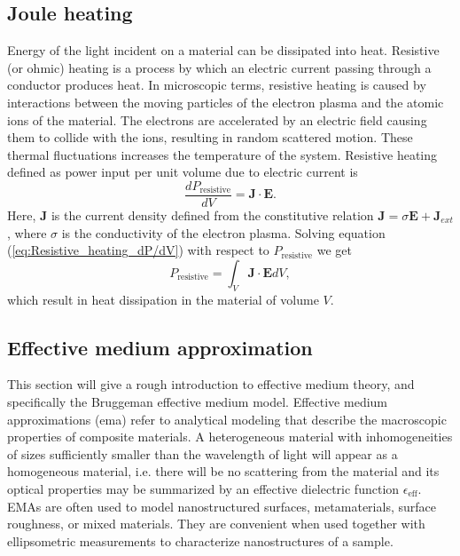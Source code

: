\subsection{Joule heating}
Energy of the light incident on a material can be dissipated into heat. Resistive (or ohmic) heating is a process by which an electric current passing through a conductor produces heat. In microscopic terms, resistive heating is caused by interactions between the moving particles of the electron plasma and the atomic ions of the material. The electrons are accelerated by an electric field causing them to collide with the ions, resulting in random scattered motion. These thermal fluctuations increases the temperature of the system. Resistive heating defined as power input per unit volume due to electric current is \cite{jackson}
\begin{equation}
    \frac{dP_{\text{resistive}}}{dV} = \mathbf{J}\cdot\mathbf{E}.
    \label{eq:Resistive_heating_dP/dV}
\end{equation}
Here, $\mathbf{J}$ is the current density defined from the constitutive relation $\mathbf{J}=\sigma\mathbf{E}+\mathbf{J}_{ext}$, where $\sigma$ is the conductivity of the electron plasma.  Solving equation (\ref{eq:Resistive_heating_dP/dV}) with respect to $P_{\text{resistive}}$ we get
\begin{equation}
    P_{\text{resistive}} = \int_V \mathbf{J}\cdot\mathbf{E} dV,
    \label{eq:Resistive_heating_P}
\end{equation}
which result in heat dissipation in the material of volume $V$.

\subsection{Effective medium approximation}
This section will give a rough introduction to effective medium theory, and specifically the Bruggeman effective medium model. Effective medium approximations (\ac{ema}) refer to analytical modeling that describe the macroscopic properties of composite materials. A heterogeneous material with inhomogeneities of sizes sufficiently smaller than the wavelength of light will appear as a homogeneous material, i.e. there will be no scattering from the material and its optical properties may be summarized by an effective dielectric function $\epsilon_\text{eff}$\cite{hans_arwin}. EMAs are often used to model nanostructured surfaces, metamaterials, surface roughness, or mixed materials. They are convenient when used together with ellipsometric measurements to characterize nanostructures of a sample.

